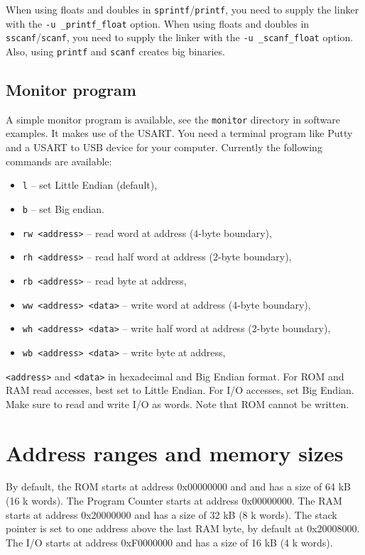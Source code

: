 \documentclass[12pt]{article}
\begin{document}
When using floats and doubles in \texttt{sprintf}/\texttt{printf}, you need to supply the linker with the \lstinline|-u _printf_float| option. When using floats and doubles in \texttt{sscanf}/\texttt{scanf}, you need to supply the linker with the \lstinline|-u _scanf_float| option. Also, using \texttt{printf} and \texttt{scanf} creates big binaries.

\subsection{Monitor program}
A simple monitor program is available, see the \texttt{monitor} directory in software examples. It makes use of the USART. You need a terminal program like Putty and a USART to USB device for your computer. Currently the following commands are available:

\begin{itemize}
\item \texttt{l} -- set Little Endian (default),
\item \texttt{b} -- set Big endian.
\item \texttt{rw <address>} -- read word at address (4-byte boundary),
\item \texttt{rh <address>} -- read half word at address (2-byte boundary),
\item \texttt{rb <address>} -- read byte at address,
\item \texttt{ww <address> <data>} -- write word at address (4-byte boundary),
\item \texttt{wh <address> <data>} -- write half word at address (2-byte boundary),
\item \texttt{wb <address> <data>} -- write byte at address,
\end{itemize}

\texttt{<address>} and \texttt{<data>} in hexadecimal and Big Endian format. For ROM and RAM read accesses, best set to Little Endian. For I/O accesses, set Big Endian. Make sure to read and write I/O as words. Note that ROM cannot be written.

\section{Address ranges and memory sizes}
By default, the ROM starts at address 0x00000000 and and has a size of 64 kB (16 k words). The Program Counter starts at address 0x00000000. The RAM starts at address 0x20000000 and has a size of 32 kB (8 k words). The stack pointer is set to one address above the last RAM byte, by default at 0x20008000. The I/O starts at address 0xF0000000 and has a size of 16 kB (4 k words).
\end{document}
